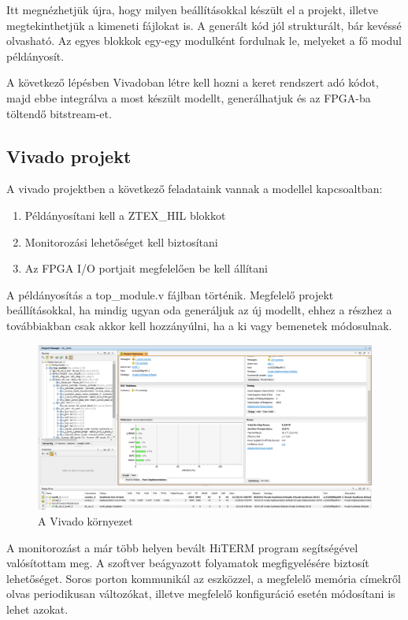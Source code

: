 Itt megnézhetjük újra, hogy milyen beállításokkal készült el a projekt, illetve megtekinthetjük a kimeneti fájlokat is. A generált kód jól strukturált, bár kevéssé olvasható. Az egyes blokkok egy-egy modulként fordulnak le, melyeket a fő modul példányosít.

A következő lépésben Vivadoban létre kell hozni a keret rendszert adó kódot, majd ebbe integrálva a most készült modellt, generálhatjuk és az FPGA-ba töltendő bitstream-et.

\subsection{Vivado projekt}

A vivado projektben a következő feladataink vannak a modellel kapcsoaltban:
\begin{enumerate}
	\item{Példányosítani kell a ZTEX\_HIL blokkot}
	\item{Monitorozási lehetőséget kell biztosítani}
	\item{Az FPGA I/O portjait megfelelően be kell állítani}
\end{enumerate}

A példányosítás a top\_module.v fájlban történik. Megfelelő projekt beállításokkal, ha mindig ugyan oda generáljuk az új modellt, ehhez a részhez a továbbiakban csak akkor kell hozzányúlni, ha a ki vagy bemenetek módosulnak.

\begin{figure}[H]
	\centering
	\includegraphics[width = \textwidth]{figures/vivado.png}
	\caption{A Vivado környezet} 
	\label{fig:hdl_report}
\end{figure}

A monitorozást a már több helyen bevált HiTERM program segítségével valósítottam meg. A szoftver beágyazott folyamatok megfigyelésére biztosít lehetőséget. Soros porton kommunikál az eszközzel, a megfelelő memória címekről olvas periodikusan változókat, illetve megfelelő konfiguráció esetén módosítani is lehet azokat.